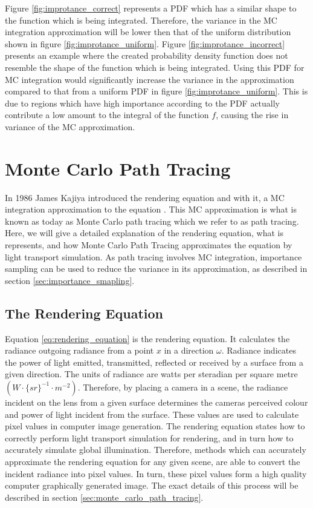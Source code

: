 \documentclass[../dissertation.tex]{subfiles}
\begin{document}
Figure \ref{fig:improtance_correct} represents a PDF which has a similar shape to the function which is being integrated. Therefore, the variance in the MC integration approximation will be lower then that of the uniform distribution shown in figure \ref{fig:improtance_uniform}. Figure \ref{fig:improtance_incorrect} presents an example where the created probability density function does not resemble the shape of the function which is being integrated. Using this PDF for MC integration would significantly increase the variance in the approximation compared to that from a uniform PDF in figure \ref{fig:improtance_uniform}. This is due to regions which have high importance according to the PDF actually contribute a low amount to the integral of the function $f$, causing the rise in variance of the MC approximation.


\section{Monte Carlo Path Tracing}
\label{sec:mc_pathtracing}
In 1986 James Kajiya introduced the rendering equation and with it, a MC integration approximation to the equation \cite{kajiya1986rendering}. This MC approximation is what is known as today as Monte Carlo path tracing which we refer to as path tracing. Here, we will give a detailed explanation of the rendering equation, what is represents, and how Monte Carlo Path Tracing approximates the equation by light transport simulation. As path tracing involves MC integration, importance sampling can be used to reduce the variance in its approximation, as described in section \ref{sec:importance_smapling}.

\subsection{The Rendering Equation}
\label{sec:rendering_equation}

Equation \ref{eq:rendering_equation} is the rendering equation. It calculates the radiance outgoing radiance from a point $x$ in a direction $\omega$. Radiance indicates the power of light emitted, transmitted, reflected or received by a surface from a given direction. The units of radiance are watts per steradian per square metre $(W \cdot \{sr\}^{-1} \cdot m^{-2})$. Therefore, by placing a camera in a scene, the radiance incident on the lens from a given surface determines the cameras perceived colour and power of light incident from the surface. These values are used to calculate pixel values in computer image generation. The rendering equation states how to correctly perform light transport simulation for rendering, and in turn how to accurately simulate global illumination. Therefore, methods which can accurately approximate the rendering equation for any given scene, are able to convert the incident radiance into pixel values. In turn, these pixel values form a high quality computer graphically generated image. The exact details of this process will be described in section \ref{sec:monte_carlo_path_tracing}.
\end{document}
